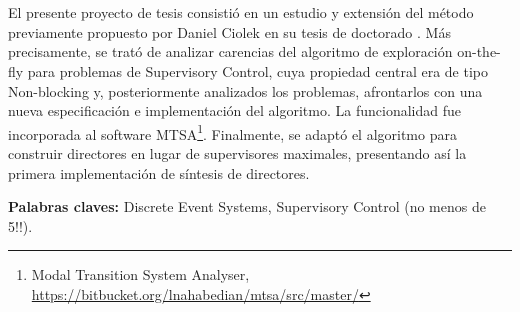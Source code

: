 \chapter*{\runtitulo}

\noindent 
El presente proyecto de tesis consistió en un estudio y extensión del método previamente propuesto por Daniel Ciolek en su tesis de doctorado \cite{tesisDani}. Más precisamente, se trató de analizar carencias del algoritmo de exploración on-the-fly para problemas de Supervisory Control, cuya propiedad central era de tipo Non-blocking y, posteriormente analizados los problemas, afrontarlos con una nueva especificación e implementación del algoritmo. La funcionalidad fue incorporada al software MTSA\footnote{Modal Transition System Analyser, \href{https://bitbucket.org/lnahabedian/mtsa/src/master/^}{https://bitbucket.org/lnahabedian/mtsa/src/master/}}. Finalmente, se adaptó el algoritmo para construir directores en lugar de supervisores maximales, presentando así la primera implementación de síntesis de directores.

\bigskip

\noindent\textbf{Palabras claves:} Discrete Event Systems, Supervisory Control (no menos de 5!!).
